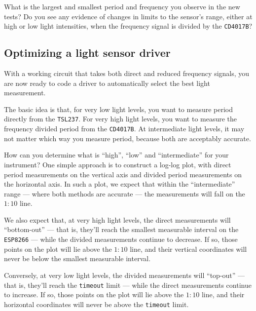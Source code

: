 \begin{enumerate}
	What is the largest and smallest period and frequency you observe in the new tests?
	Do you see any evidence of changes in limits to the sensor's range, either at high or low light intensities, when the frequency signal is divided by the \texttt{CD4017B}?

\end{enumerate}



\subsection{Optimizing a light sensor driver}
With a working circuit that takes both direct and reduced frequency signals, you are now ready to code a driver to automatically select the best light measurement.

The basic idea is that, for very low light levels, you want to measure period directly from the \texttt{TSL237}.
For very high light levels, you want to measure the frequency divided period from the \texttt{CD4017B}.
At intermediate light levels, it may not matter which way you measure period, because both are acceptably accurate.

How can you determine what is ``high'', ``low'' and ``intermediate'' for your instrument?
One simple approach is to construct a log-log plot, with direct period measurements on the vertical axis and divided period measurements on the horizontal axis.
In such a plot, we expect that within the ``intermediate'' range --- where both methods are accurate --- the measurements will fall on the $1:10$ line.

We also expect that, at very high light levels, the direct measurements will ``bottom-out'' --- that is, they'll reach the smallest measurable interval on the \texttt{ESP8266} --- while the divided measurements continue to decrease.
If so, those points on the plot will lie above the $1:10$ line, and their vertical coordinates will never be below the smallest measurable interval.

Conversely, at very low light levels, the divided measurements will ``top-out'' --- that is, they'll reach the \texttt{timeout} limit --- while the direct measurements continue to increase.
If so, those points on the plot will lie above the $1:10$ line, and their horizontal coordinates will never be above the \texttt{timeout} limit.


